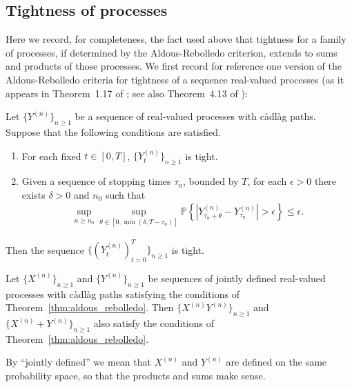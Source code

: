 \documentclass[EJP]{ejpecp} %
\newcommand{\IP}{\mathbb P}
\newcommand{\citet}[1]{\cite{#1}}
\begin{document}
\subsection{Tightness of processes}
\label{apx:aldous rebolledo}

Here we record, for completeness, the fact used above
that tightness for a family of processes, if determined by the Aldous-Rebolledo criterion,
extends to sums and products of those processes.
We first record for reference
one version of the Aldous-Rebolledo criteria for tightness of a sequence real-valued processes
(as it appears in Theorem~1.17 of \citet{etheridge2000introduction};
see also Theorem~4.13 of \citet{jacod/shiryaev:2013}):

\begin{theorem}[\citet{rebolledo:1980}]
    \label{thm:aldous_rebolledo}
    Let $\{Y^{(n)}\}_{n \ge 1}$ be a sequence of real-valued processes
    with c\`adl\`ag paths.
    Suppose that the following conditions are satisfied.
    \begin{enumerate}
        \item For each fixed $t \in [0,T]$, $\{Y_t^{(n)}\}_{n \ge 1}$  is tight.
        \item Given a sequence of stopping times $\tau_n$, bounded by $T$,
            for each $\epsilon > 0$ there exists $\delta > 0$ and $n_0$ such that
            \begin{align*}
                \sup_{n \ge n_0}
                \sup_{\theta \in [0, \min(\delta,T-\tau_n)]}
                \IP\left\{ \left|
                    Y^{(n)}_{\tau_n + \theta} - Y^{(n)}_{\tau_n}
                \right| > \epsilon
                \right\}
                \le \epsilon .
            \end{align*}
    \end{enumerate}
    Then the sequence $\{(Y^{(n)}_t)_{t=0}^T\}_{n \ge 1}$ is tight.
\end{theorem}

\begin{lemma}
    \label{lem:product_tightness}
    Let $\{X^{(n)}\}_{n \ge 1}$ and $\{Y^{(n)}\}_{n \ge 1}$ be sequences of jointly defined
    real-valued processes with c\`adl\`ag paths
    satisfying the conditions of Theorem~\ref{thm:aldous_rebolledo}.
    Then $\{X^{(n)}Y^{(n)}\}_{n \ge 1}$ and $\{X^{(n)} + Y^{(n)}\}_{n \ge 1}$ also
    satisfy the conditions of Theorem~\ref{thm:aldous_rebolledo}.
\end{lemma}

By ``jointly defined'' we mean that $X^{(n)}$ and $Y^{(n)}$ are defined on the same
probability space, so that the products and sums make sense.
\end{document}
